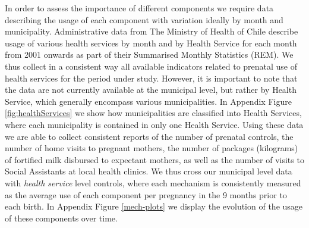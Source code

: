 \documentclass[12pt]{article}
\begin{document}
\begin{spacing}{1.4}
In order to assess the importance of different components we require data
describing the usage of each component with variation ideally by month and
municipality.  Administrative data from The Ministry of Health of Chile
describe usage of various health services by month and by Health Service
for each month from 2001 onwards as part of their Summarised Monthly
Statistics (REM).  We thus collect in a consistent way all available indicators
related to prenatal use of health services for the period under study.  However,
it is important to note that the data are not currently available at the
municipal level, but rather by Health Service, which generally encompass
various municipalities.  In Appendix Figure \ref{fig:healthServices} we show
how municipalities are classified into Health Services, where each municipality
is contained in only one Health Service.  Using these data we are able to
collect consistent reports of the number of prenatal controls, the number of
home visits to pregnant mothers, the number of packages (kilograms) of
fortified milk disbursed to expectant mothers, as well as the number of visits
to Social Assistants at local health clinics.   We thus cross our municipal
level data with \emph{health service} level controls, where each mechanism is
consistently measured as the average use of each component per pregnancy in the
9 months prior to each birth. In Appendix Figure \ref{mech-plots} we display
the evolution of the usage of these components over time.


\end{spacing}
\end{document}
